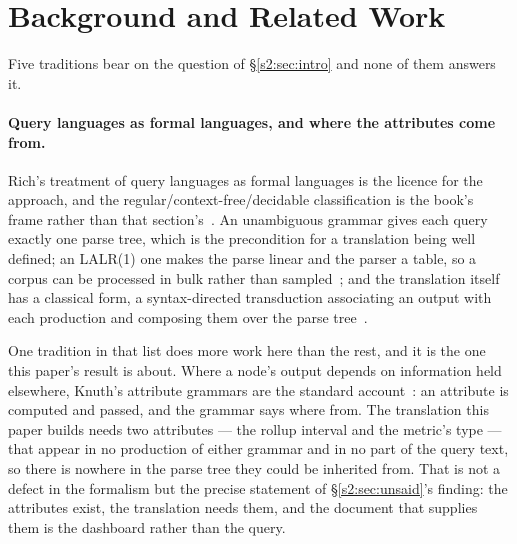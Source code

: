 
\section{Background and Related Work}
\label{s2:sec:background}

Five traditions bear on the question of \S\ref{s2:sec:intro} and none of them answers it.

\paragraph{Query languages as formal languages, and where the attributes come from.}
Rich's treatment of query languages as formal languages is the licence for the approach,
and the regular/context-free/decidable classification is the book's frame rather than that
section's~\citep{rich2008}. An unambiguous grammar gives each query exactly one parse tree,
which is the precondition for a translation being well defined; an LALR(1) one makes the
parse linear and the parser a table, so a corpus can be processed in bulk rather than
sampled~\citep{aho2006}; and the translation itself has a classical form, a syntax-directed
transduction associating an output with each production and composing them over the parse
tree~\citep{lewis1968}.

One tradition in that list does more work here than the rest, and it is the one this
paper's result is about. Where a node's output depends on information held elsewhere,
Knuth's attribute grammars are the standard account~\citep{knuth1968}: an attribute is
computed and passed, and the grammar says where from. The translation this paper builds
needs two attributes --- the rollup interval and the metric's type --- that appear in no
production of either grammar and in no part of the query text, so there is nowhere in the
parse tree they could be inherited from. That is not a defect in the formalism but the
precise statement of \S\ref{s2:sec:unsaid}'s finding: the attributes exist, the translation
needs them, and the document that supplies them is the dashboard rather than the query.

